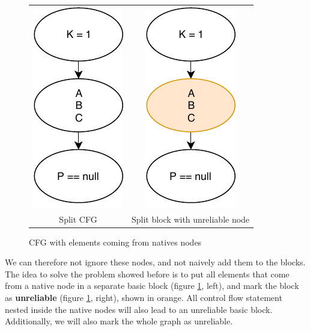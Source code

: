 \begin{figure}[h]
	\caption{CFG with elements coming from natives nodes}
	\label{figure:two-unreliable-cfg}
	\setlength{\tabcolsep}{24pt}
	\begin{tabular}{cc}
		\includegraphics[]{figure/unreliable-cfg-1.pdf}  &
		\includegraphics[]{figure/unreliable-cfg-2.pdf}   \\ 
		Split CFG & Split block with unreliable node
	\end{tabular}
\end{figure}

We can therefore not ignore these nodes, and not naively add them to the blocks.
The idea to solve the problem showed before is to put all elements that come from a native node in a separate basic block (figure \ref{figure:two-unreliable-cfg}, left), and mark the block as \textbf{unreliable} (figure \ref{figure:two-unreliable-cfg}, right), shown in orange.
All control flow statement nested inside the native nodes will also lead to an unreliable basic block.\newline
Additionally, we will also mark the whole graph as unreliable. 

